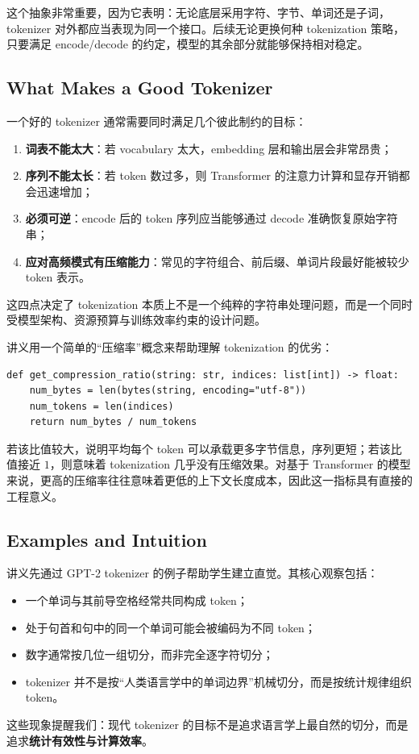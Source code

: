 \documentclass[a4paper,UTF8]{article}
\numberwithin{equation}{section}
\begin{document}
这个抽象非常重要，因为它表明：无论底层采用字符、字节、单词还是子词，tokenizer 对外都应当表现为同一个接口。后续无论更换何种 tokenization 策略，只要满足 encode/decode 的约定，模型的其余部分就能够保持相对稳定。

\subsection{What Makes a Good Tokenizer}

一个好的 tokenizer 通常需要同时满足几个彼此制约的目标：
\begin{enumerate}
    \item \textbf{词表不能太大}：若 vocabulary 太大，embedding 层和输出层会非常昂贵；
    \item \textbf{序列不能太长}：若 token 数过多，则 Transformer 的注意力计算和显存开销都会迅速增加；
    \item \textbf{必须可逆}：encode 后的 token 序列应当能够通过 decode 准确恢复原始字符串；
    \item \textbf{应对高频模式有压缩能力}：常见的字符组合、前后缀、单词片段最好能被较少 token 表示。
\end{enumerate}
这四点决定了 tokenization 本质上不是一个纯粹的字符串处理问题，而是一个同时受模型架构、资源预算与训练效率约束的设计问题。

讲义用一个简单的“压缩率”概念来帮助理解 tokenization 的优劣：

\begin{verbatim}
def get_compression_ratio(string: str, indices: list[int]) -> float:
    num_bytes = len(bytes(string, encoding="utf-8"))
    num_tokens = len(indices)
    return num_bytes / num_tokens
\end{verbatim}

若该比值较大，说明平均每个 token 可以承载更多字节信息，序列更短；若该比值接近 $1$，则意味着 tokenization 几乎没有压缩效果。对基于 Transformer 的模型来说，更高的压缩率往往意味着更低的上下文长度成本，因此这一指标具有直接的工程意义。

\subsection{Examples and Intuition}

讲义先通过 GPT-2 tokenizer 的例子帮助学生建立直觉。其核心观察包括：
\begin{itemize}
    \item 一个单词与其前导空格经常共同构成 token；
    \item 处于句首和句中的同一个单词可能会被编码为不同 token；
    \item 数字通常按几位一组切分，而非完全逐字符切分；
    \item tokenizer 并不是按“人类语言学中的单词边界”机械切分，而是按统计规律组织 token。
\end{itemize}
这些现象提醒我们：现代 tokenizer 的目标不是追求语言学上最自然的切分，而是追求\textbf{统计有效性与计算效率}。
\end{document}
